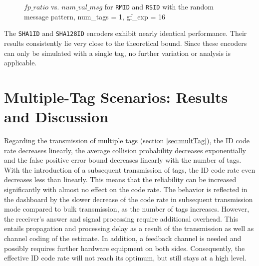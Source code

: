 \documentclass[english,BCOR=4mm,cdfont=false]{tudscrreprt} %
\begin{document}
\begin{figure}[!t]
    \centering
    
    \caption{$fp\_ratio$ vs. $num\_val\_msg$ for \texttt{RMID} and \texttt{RSID} with the random message pattern, num\_tags = 1, gf\_exp = 16} 
    \label{fig:fpratioRandom}
\end{figure}

The \texttt{SHA1ID} and \texttt{SHA128ID} encoders exhibit nearly identical performance. Their results consistently lie very close to the theoretical bound. Since these encoders can only be simulated with a single tag, no further variation or analysis is applicable.

\section{Multiple-Tag Scenarios: Results and Discussion}
\label{sec:FindingsMultiTag}

Regarding the transmission of multiple tags (section \ref{sec:multTag}), the ID code rate decreases linearly, the average collision probability decreases exponentially and the false positive error bound decreases linearly with the number of tags. With the introduction of a subsequent transmission of tags, the ID code rate even decreases less than linearly. This means that the reliability can be increased significantly with almost no effect on the code rate. 
The behavior is reflected in the dashboard by the slower decrease of the code rate in subsequent transmission mode compared to bulk transmission, as the number of tags increases. However, the receiver's answer and signal processing require additional overhead. This entails propagation and processing delay as a result of the  transmission as well as channel coding of the estimate. In addition, a feedback channel is needed and possibly requires further hardware equipment on both sides.
Consequently, the effective ID code rate will not reach its optimum, but still stays at a high level.

\end{document}
